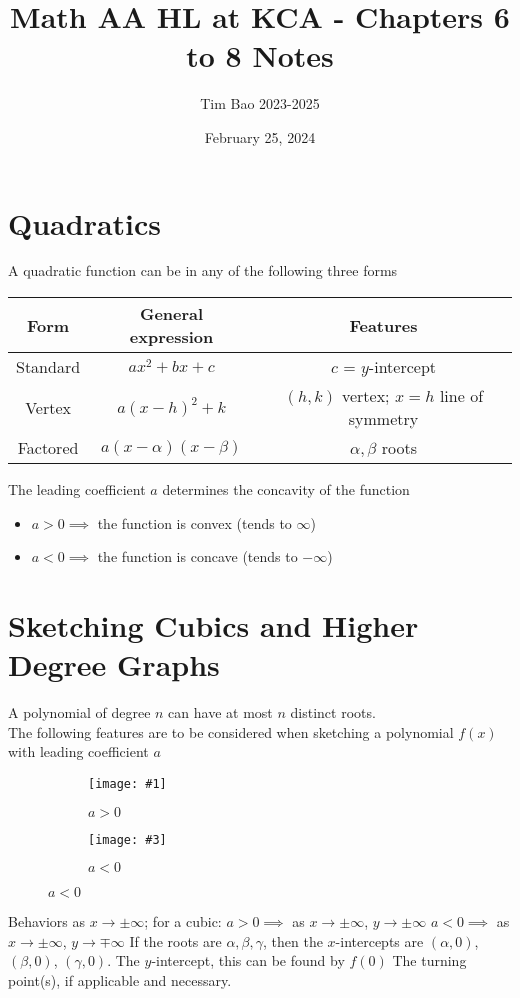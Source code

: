\documentclass[11pt]{article}
\title{Math AA HL at KCA - Chapters 6 to 8 Notes}
\author{Tim Bao 2023-2025}
\date{February 25, 2024}
\newcommand{\lb}{\\[8pt]}
\newcommand{\doubleimg}[4]{\begin{center}
  \begin{figure}[H]
    \centering
    \begin{subfigure}{.45\textwidth}
      \centering
      \texttt{[image: \#1]}
      \caption{#2}
      \label{fig:sub1}
    \end{subfigure}
    \begin{subfigure}{.45\textwidth}
      \centering
      \texttt{[image: \#3]}
      \caption{#4}
      \label{fig:sub2}
    \end{subfigure}
  \end{figure}
\end{center}}
\begin{document}
\maketitle
\pagebreak

\section{Quadratics}

A quadratic function can be in any of the following three forms

\begin{center}
  \begin{tabular}{c|c|c}
    Form     & General expression         & Features                                  \\ \hline
    Standard & $ax^2 + bx + c$            & $c$ = $y$-intercept                       \\
    Vertex   & $a(x - h)^2 + k$           & $(h, k)$ vertex; $x = h$ line of symmetry \\
    Factored & $a(x - \alpha)(x - \beta)$ & $\alpha, \beta$ roots                     \\
  \end{tabular}
\end{center}

\noindent The leading coefficient $a$ determines the concavity of the function
\begin{itemize}
  \item $a > 0 \implies$ the function is convex (tends to $\infty$)
  \item $a < 0 \implies$ the function is concave (tends to $-\infty$)
\end{itemize}

\pagebreak

\section{Sketching Cubics and Higher Degree Graphs}

A polynomial of degree $n$ can have at most $n$ distinct roots. \lb
The following features are to be considered when sketching a polynomial $f(x)$ with leading coefficient $a$

\doubleimg{figs/cubic1.png}{$a > 0$}{figs/cubic2.png}{$a < 0$}

\begin{outline}[enumerate]
  \1 Behaviors as $x\to \pm\infty$; for a cubic:
  \2 $a > 0 \implies$ as $x\to\pm\infty$, $y\to\pm\infty$
  \2 $a < 0 \implies$ as $x\to\pm\infty$, $y\to\mp\infty$
  \1 If the roots are $\alpha, \beta, \gamma$, then the $x$-intercepts are $(\alpha, 0)$, $(\beta, 0)$, $(\gamma, 0)$.
  \1 The $y$-intercept, this can be found by $f(0)$
  \1 The turning point(s), if applicable and necessary.
\end{outline}
\end{document}
